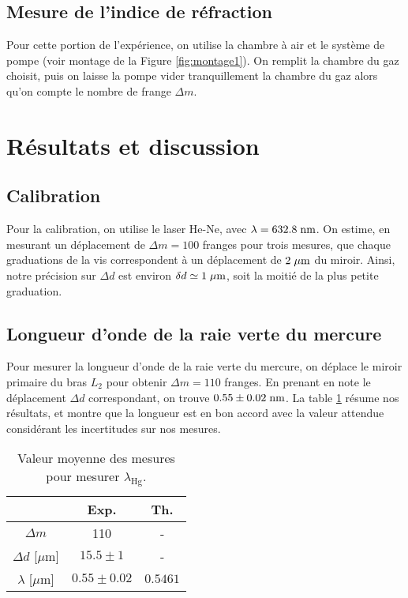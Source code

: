 \documentclass[10pt,letterpaper,twocolumn]{article}
\newcommand{\s}{\hspace{0.1cm}}
\begin{document}
\subsection{Mesure de l'indice de réfraction}
Pour cette portion de l'expérience, on utilise la chambre à air et le système de pompe (voir montage de la Figure \ref{fig:montage1}). On remplit la chambre du gaz choisit, puis on laisse la pompe vider tranquillement la chambre du gaz alors qu'on compte le nombre de frange $\Delta m$. 

\section{Résultats et discussion }\label{sec:resultats} %

\subsection{Calibration}
Pour la calibration, on utilise le laser He-Ne, avec $\lambda = 632.8\s\text{nm}$. On estime, en mesurant un déplacement de $\Delta m = 100$ franges pour trois mesures, que chaque graduations de la vis correspondent à un déplacement de $2\s \mu\text{m}$ du miroir. Ainsi, notre précision sur $\Delta d$ est environ $\delta d \simeq 1\s \mu\text{m}$, soit la moitié de la plus petite graduation. 


\subsection{Longueur d'onde de la raie verte du mercure}
Pour mesurer la longueur d'onde de la raie verte du mercure, on déplace le miroir primaire du bras $L_2$ pour obtenir $\Delta m = 110$ franges. En prenant en note le déplacement $\Delta d$ correspondant, on trouve $0.55 \pm 0.02\s \text{nm}$. La table \ref{tab:Hg} résume nos résultats, et montre que la longueur est en bon accord avec la valeur attendue considérant les incertitudes sur nos mesures. 
\begin{table}[H]
	\centering
	\caption{Valeur moyenne des mesures pour mesurer $\lambda_{\text{Hg}} $. }
	\label{tab:Hg}
	\begin{tabular}{|c|c|c|}
	  \hline
	      & Exp. & Th. \\\hline
		$\Delta m$ & 110 & - \\\hline
		$\Delta d$ [$\mu$m] & $15.5\pm 1$ & -  \\\hline
		$\lambda$ [$\mu$m]   &  $0.55 \pm 0.02$ & $0.5461$ \\\hline
	\end{tabular}
\end{table}
\end{document}
